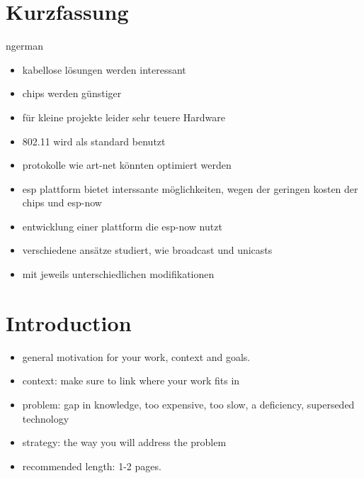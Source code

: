 \documentclass[]{ccs-thesis}
\begin{document}
\chapter*{Kurzfassung}
\begin{otherlanguage*}{ngerman}
\begin{itemize}
	\item kabellose lösungen werden interessant
	\item chips werden günstiger
	\item für kleine projekte leider sehr teuere Hardware
	\item 802.11 wird als standard benutzt
	\item protokolle wie art-net könnten optimiert werden
	\item esp plattform bietet interssante möglichkeiten, wegen der geringen kosten der chips und esp-now
	\item entwicklung einer plattform die esp-now nutzt
	\item verschiedene ansätze studiert, wie broadcast und unicasts
	\item mit jeweils unterschiedlichen modifikationen
\end{itemize}


\end{otherlanguage*}
\acresetall

\cleardoublepage
\tableofcontents
{}

\cleardoublepage
{}



\chapter{Introduction}

\begin{itemize}
	\item general motivation for your work, context and goals.
	\item context: make sure to link where your work fits in
	\item problem: gap in knowledge, too expensive, too slow, a deficiency, superseded technology
	\item strategy: the way you will address the problem
	\item recommended length: 1-2 pages.
\end{itemize}
\end{document}
